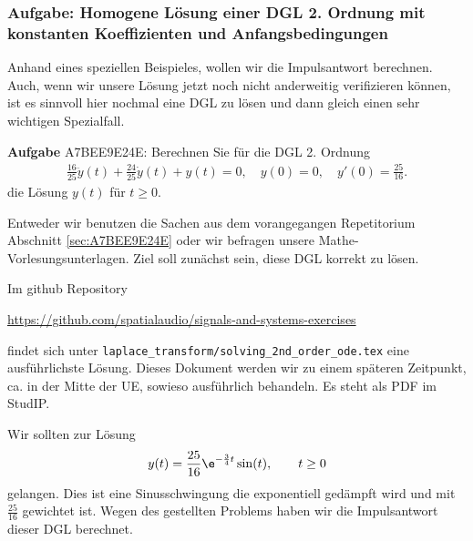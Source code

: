 \subsubsection{Aufgabe: Homogene Lösung einer DGL 2. Ordnung mit konstanten
Koeffizienten und Anfangsbedingungen}
\label{sec:A7BEE9E24E_Aufgabe}
\begin{Ziel}
Anhand eines speziellen Beispieles, wollen wir die Impulsantwort berechnen. Auch,
wenn wir unsere Lösung jetzt noch nicht anderweitig verifizieren können,
ist es sinnvoll hier nochmal eine DGL zu lösen und dann gleich einen sehr wichtigen
Spezialfall.
\end{Ziel}
\textbf{Aufgabe} {\tiny A7BEE9E24E}: Berechnen Sie für die DGL 2. Ordnung
\begin{align}
\frac{16}{25} \ddot{y}(t) + \frac{24}{25} \dot{y}(t) + y(t) = 0,
\quad y(0)=0,\quad y'(0)=\frac{25}{16}.
\end{align}
die Lösung $y(t)$ für $t\geq 0$.
\begin{Werkzeug}
Entweder wir benutzen die Sachen aus dem vorangegangen Repetitorium Abschnitt
\ref{sec:A7BEE9E24E} oder
wir befragen unsere Mathe-Vorlesungsunterlagen. Ziel soll zunächst sein, diese
DGL korrekt zu lösen.
\end{Werkzeug}
\begin{Ansatz}
Im github Repository

\url{https://github.com/spatialaudio/signals-and-systems-exercises}

findet sich unter \verb|laplace_transform/solving_2nd_order_ode.tex| eine
ausführlichste Lösung.
Dieses Dokument werden wir zu einem späteren Zeitpunkt, ca. in der Mitte der
UE, sowieso ausführlich behandeln. Es steht als PDF im StudIP.
\end{Ansatz}
\begin{Loesung}
Wir sollten zur Lösung
\begin{align}
y(t) = \frac{25}{16} \e^{-\frac{3}{4} t} \sin(t), \qquad t\geq 0
\end{align}
gelangen.
%
Dies ist eine Sinusschwingung die exponentiell gedämpft wird und mit
$\frac{25}{16}$ gewichtet ist.
Wegen des gestellten Problems haben wir die Impulsantwort dieser DGL berechnet.
\end{Loesung}
